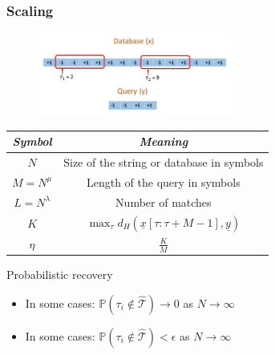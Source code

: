 \documentclass[10pt,xcolor=table]{beamer}
\newcommand{\mbb}{\mathbb}
\newcommand{\xv}{\underline{x}}
\newcommand{\yv}{\underline{y}}
\begin{document}
\begin{frame}\frametitle{Scaling}

	\begin{figure}[t]
		\centering
		\includegraphics[width=2.5in]{Pattern_matching_ex.pdf}
	\end{figure}
	\vspace{-8pt}
	{\small
	\begin{table}[h!]
		\label{Table:Notations3}
		\begin{center}
			\begin{tabular}{|c|c|} 	
				\hline		
				\textit{Symbol}		&  \textit{Meaning} \\		
				\hline
				$N$           		& Size of the string or database in symbols \\
				\hline
				$M = N^{\mu}$       & Length of the query in symbols \\
				\hline
				$L = N^\lambda$    &   Number of matches \\
				\hline
				$K$             &$\max_{\tau}d_{H}(\xv[\tau:\tau+M-1],\yv)$\\
				\hline
				$\eta$             &$\frac{K}{M}$\\
				\hline
			\end{tabular}
		\end{center}
	\end{table}
    }
    \begin{block}{Probabilistic recovery}
    \begin{itemize}
    \item In some cases: $\mbb{P}(\tau_i \notin \hat{\mathcal{T}}) \rightarrow 0$ as $N \rightarrow \infty$
    \item In some cases: $\mbb{P}(\tau_i \notin \hat{\mathcal{T}}) < \epsilon$ as $N \rightarrow \infty$
    \end{itemize}
    \end{block}
	\end{frame}	
\end{document}
